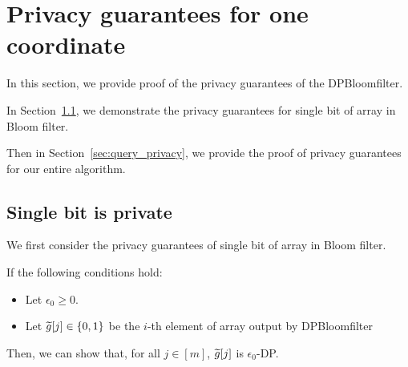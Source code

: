 \section{Privacy guarantees for one coordinate}\label{sec:appendix_privacy_guarantees}
In this section, we provide proof of the privacy guarantees of the DPBloomfilter.

In Section~\ref{sec:single_bit_private}, we demonstrate the privacy guarantees for single bit of array in Bloom filter.

Then in Section~\ref{sec:query_privacy}, we provide the proof of privacy guarantees for our entire algorithm.

\subsection{Single bit is private} \label{sec:single_bit_private}
We first consider the privacy guarantees of single bit of array in Bloom filter.
\begin{lemma}  \label{lem:eps0_DP:formal}
If the following conditions hold:
\begin{itemize}
    \item Let $\epsilon_0 \geq 0$. 
    \item Let $\widetilde{g}[j] \in \{0,1\}$ be the $i$-th element of array output by DPBloomfilter  
    
    
\end{itemize}

Then, we can show that, for all
$j \in [m]$, $\widetilde{g}[j]$ is $\epsilon_0$-DP. 
\end{lemma}

